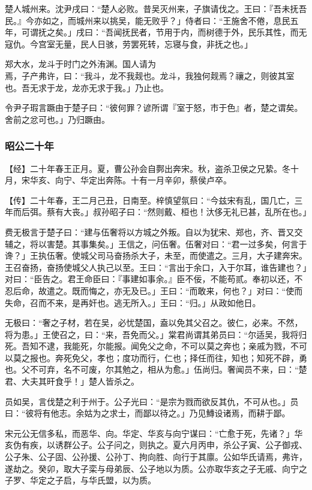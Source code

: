 \documentclass[]{article}
\begin{document}
楚人城州来。沈尹戌曰：``楚人必败。昔吴灭州来，子旗请伐之。王曰：『吾未抚吾民。』今亦如之，而城州来以挑吴，能无败乎？」侍者曰：``王施舍不倦，息民五年，可谓抚之矣。」戌曰：``吾闻抚民者，节用于内，而树德于外，民乐其性，而无寇仇。今宫室无量，民人日骇，劳罢死转，忘寝与食，非抚之也。」

郑大水，龙斗于时门之外洧渊。国人请为\\
焉，子产弗许，曰：``我斗，龙不我觌也。龙斗，我独何觌焉？禳之，则彼其室也。吾无求于龙，龙亦无求于我。」乃止也。

令尹子瑕言蹶由于楚子曰：``彼何罪？谚所谓『室于怒，市于色』者，楚之谓矣。舍前之忿可也。」乃归蹶由。

\hypertarget{header-n2687}{%
\subsubsection{昭公二十年}\label{header-n2687}}

【经】二十年春王正月。夏，曹公孙会自鄸出奔宋。秋，盗杀卫侯之兄絷。冬十月，宋华亥、向宁、华定出奔陈。十有一月辛卯，蔡侯卢卒。

【传】二十年春，王二月己丑，日南至。梓慎望氛曰：``今兹宋有乱，国几亡，三年而后弭。蔡有大丧。」叔孙昭子曰：``然则戴、桓也！汏侈无礼已甚，乱所在也。」

费无极言于楚子曰：``建与伍奢将以方城之外叛。自以为犹宋、郑也，齐、晋又交辅之，将以害楚。其事集矣。」王信之，问伍奢。伍奢对曰：``君一过多矣，何言于谗？」王执伍奢。使城父司马奋扬杀大子，未至，而使遣之。三月，大子建奔宋。王召奋扬，奋扬使城父人执己以至。王曰：``言出于余口，入于尔耳，谁告建也？」对曰：``臣告之。君王命臣曰：『事建如事余。』臣不佞，不能苟贰。奉初以还，不忍后命，故遣之。既而悔之，亦无及已。」王曰：``而敢来，何也？」对曰：``使而失命，召而不来，是再奸也。逃无所入。」王曰：``归。」从政如他日。

无极曰：``奢之子材，若在吴，必忧楚国，盍以免其父召之。彼仁，必来。不然，将为患。」王使召之，曰：``来，吾免而父。」棠君尚谓其弟员曰：``尔适吴，我将归死。吾知不逮，我能死，尔能报。闻免父之命，不可以莫之奔也；亲戚为戮，不可以莫之报也。奔死免父，孝也；度功而行，仁也；择任而往，知也；知死不辟，勇也。父不可弃，名不可废，尔其勉之，相从为愈。」伍尚归。奢闻员不来，曰：``楚君、大夫其旰食乎！」楚人皆杀之。

员如吴，言伐楚之利于州于。公子光曰：``是宗为戮而欲反其仇，不可从也。」员曰：``彼将有他志。余姑为之求士，而鄙以待之。」乃见鱄设诸焉，而耕于鄙。

宋元公无信多私，而恶华、向。华定、华亥与向宁谋曰：``亡愈于死，先诸？」华亥伪有疾，以诱群公子。公子问之，则执之。夏六月丙申，杀公子寅、公子御戎、公子朱、公子固、公孙援、公孙丁、拘向胜、向行于其廪。公如华氏请焉，弗许，遂劫之。癸卯，取大子栾与母弟辰、公子地以为质。公亦取华亥之子无戚、向宁之子罗、华定之子启，与华氏盟，以为质。
\end{document}
